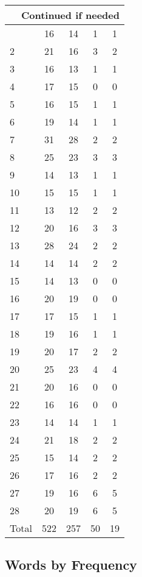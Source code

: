 \begin{center}
\begin{longtable}{l|c|c|c|c}
\hline \multicolumn{5}{|r|}{{Continued if needed}} \\ \hline
\endfoot 
1 & 16 & 14 & 1 & 1\\ \hline
2 & 21 & 16 & 3 & 2\\ \hline
3 & 16 & 13 & 1 & 1\\ \hline
4 & 17 & 15 & 0 & 0\\ \hline
5 & 16 & 15 & 1 & 1\\ \hline
6 & 19 & 14 & 1 & 1\\ \hline
7 & 31 & 28 & 2 & 2\\ \hline
8 & 25 & 23 & 3 & 3\\ \hline
9 & 14 & 13 & 1 & 1\\ \hline
10 & 15 & 15 & 1 & 1\\ \hline
11 & 13 & 12 & 2 & 2\\ \hline
12 & 20 & 16 & 3 & 3\\ \hline
13 & 28 & 24 & 2 & 2\\ \hline
14 & 14 & 14 & 2 & 2\\ \hline
15 & 14 & 13 & 0 & 0\\ \hline
16 & 20 & 19 & 0 & 0\\ \hline
17 & 17 & 15 & 1 & 1\\ \hline
18 & 19 & 16 & 1 & 1\\ \hline
19 & 20 & 17 & 2 & 2\\ \hline
20 & 25 & 23 & 4 & 4\\ \hline
21 & 20 & 16 & 0 & 0\\ \hline
22 & 16 & 16 & 0 & 0\\ \hline
23 & 14 & 14 & 1 & 1\\ \hline
24 & 21 & 18 & 2 & 2\\ \hline
25 & 15 & 14 & 2 & 2\\ \hline
26 & 17 & 16 & 2 & 2\\ \hline
27 & 19 & 16 & 6 & 5\\ \hline
28 & 20 & 19 & 6 & 5\\ \hline
\hline \hline
Total & 522 & 257 & 50 & 19




\end{longtable}
\end{center}



\subsection{Words by Frequency}

